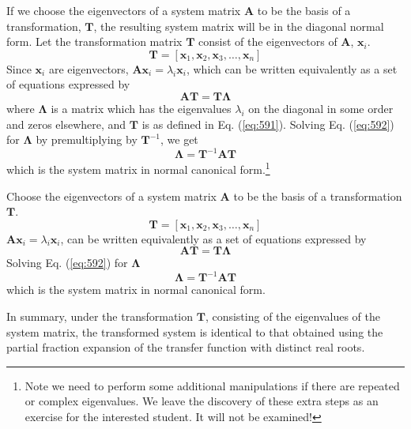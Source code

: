 If we choose the eigenvectors of a system matrix $\mathbf{A}$ to be the basis of a transformation, $\mathbf{T}$, the resulting system matrix will be in the diagonal normal form. Let the transformation matrix $\mathbf{T}$ consist of the eigenvectors of $\mathbf{A}$, $\mathbf{x}_i$.
\begin{equation}\label{eq:591}
	\mathbf{T}=[\mathbf{x}_1, \mathbf{x}_2, \mathbf{x}_3, \ldots, \mathbf{x}_n]
\end{equation}
Since $\mathbf{x}_i$ are eigenvectors, $\mathbf{A}\mathbf{x}_i=\lambda_i\mathbf{x}_i$, which can be written equivalently as a set of equations expressed by
\begin{equation}\label{eq:592}
	\mathbf{AT}=\mathbf{T\Lambda}
\end{equation}
where $\mathbf{\Lambda}$ is a matrix which has the eigenvalues $\lambda_i$ on the diagonal in some order and zeros elsewhere, and $\mathbf{T}$ is as defined in Eq. (\ref{eq:591}). Solving Eq. (\ref{eq:592}) for $\mathbf{\Lambda}$ by premultiplying by $\mathbf{T}^{-1}$, we get
\begin{equation}\label{eq:593}
	\mathbf{\Lambda}=\mathbf{T}^{-1}\mathbf{AT}
\end{equation}
which is the system matrix in normal canonical form.\footnote{Note we need to perform some additional manipulations if there are repeated or complex eigenvalues. We leave the discovery of these extra steps as an exercise for the interested student. It will not be examined!}
\ifslidesonly
\begin{slide}
   Choose the eigenvectors of a system matrix $\mathbf{A}$ to be the basis of a transformation $\mathbf{T}$.
\begin{equation}\label{eq:591}
	\mathbf{T}=[\mathbf{x}_1, \mathbf{x}_2, \mathbf{x}_3, \ldots, \mathbf{x}_n]
\end{equation}
$\mathbf{A}\mathbf{x}_i=\lambda_i\mathbf{x}_i$, can be written equivalently as a set of equations expressed by
\begin{equation}\label{eq:592}
	\mathbf{AT}=\mathbf{T\Lambda}
\end{equation}
Solving Eq. (\ref{eq:592}) for $\mathbf{\Lambda}$
\begin{equation}\label{eq:593}
	\mathbf{\Lambda}=\mathbf{T}^{-1}\mathbf{AT}
\end{equation}
which is the system matrix in normal canonical form.
\end{slide}
\fi
In summary, under the transformation $\mathbf{T}$, consisting of the eigenvalues of the system matrix, the transformed system is identical to that obtained using the partial fraction expansion of the transfer function with distinct real roots.

